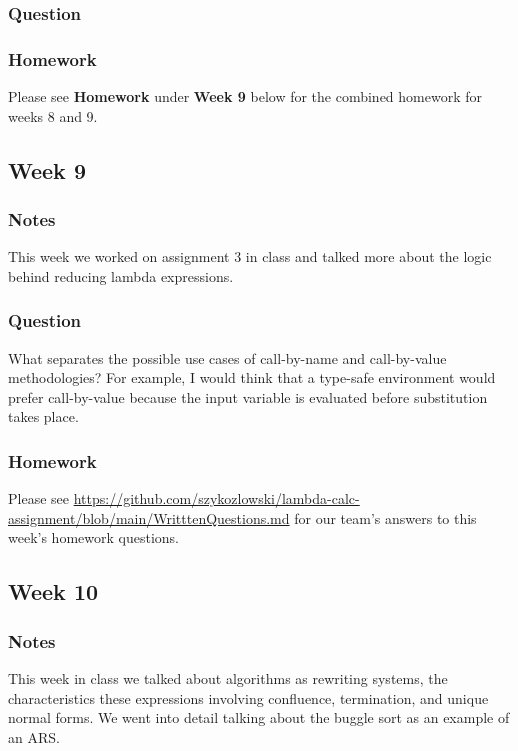 \documentclass{article}
\theoremstyle{theorem}
\theoremstyle{definition}
\theoremstyle{remark}
\begin{document}
\subsubsection*{Question} 

\subsubsection*{Homework}
Please see \textbf{Homework} under \textbf{Week 9} below for the combined homework for weeks 8 and 9.

\subsection{Week 9} 

\subsubsection*{Notes} This week we worked on assignment 3 in class and talked more about the logic behind reducing lambda expressions.

\subsubsection*{Question} What separates the possible use cases of call-by-name and call-by-value methodologies? For example, I would think that a type-safe environment would prefer call-by-value because the input variable is evaluated before substitution takes place. 

\subsubsection*{Homework}
Please see \url{https://github.com/szykozlowski/lambda-calc-assignment/blob/main/WritttenQuestions.md} for our team's answers to this week's homework questions.


\subsection{Week 10}

\subsubsection*{Notes} This week in class we talked about algorithms as rewriting systems, the characteristics these expressions involving confluence, termination, and unique normal forms. We went into detail talking about the buggle sort as an example of an ARS. 
\end{document}
